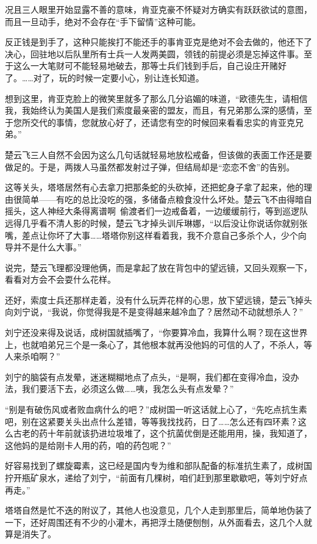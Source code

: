 况且三人眼里开始显露不善的意味，肯亚克豪不怀疑对方确实有跃跃欲试的意图，而且一旦动手，绝对不会存在“手下留情”这种可能。

反正钱是到手了，这种只能挨打不能还手的事肯亚克是绝对不会去做的，他还下了决心，回驻地以后队里所有士兵一人发两美圆，领钱的前提必须是忘掉这件事。至于这么一大笔财可不能轻易地破去，那等士兵们钱到手后，自己设庄开赌好了。……对了，玩的时候一定要小心，别让连长知道。

想到这里，肯亚克脸上的微笑里就多了那么几分谄媚的味道，“欧德先生，请相信我，我始终认为美国人是我们索度最亲密的盟友，而且，有兄弟那么深的感情，至于您所交代的事情，您就放心好了，还请您有空的时候回来看看忠实的肯亚克兄弟。”

楚云飞三人自然不会因为这么几句话就轻易地放松戒备，但该做的表面工作还是要做足的。于是，两拨人马虽然都发射过子弹，但结局却是“恋恋不舍”的告别。

这等关头，塔塔居然有心去拿刀把那条蛇的头砍掉，还把蛇身子拿了起来，他的理由很简单——有吃的总比没吃的强，多储备点粮食没什么坏处。楚云飞不由得暗自摇头，这人神经大条得离谱啊~偷渡者们一边戒备着，一边缓缓前行，等到巡逻队远得几乎看不清人影的时候，楚云飞才掉头训斥琳娜，“以后没让你说话你就别张嘴，差点让你坏了大事……塔塔你别这样看着我，我不介意自己多杀个人，少个向导并不是什么大事。”

说完，楚云飞理都没理他俩，而是拿起了放在背包中的望远镜，又回头观察一下，看看对方会不会耍什么花样。

还好，索度士兵还那样走着，没有什么玩弄花样的心思，放下望远镜，楚云飞掉头向刘宁说，“我说，你觉得我是不是变得越来越冷血了？居然动不动就想杀人？”

刘宁还没来得及说话，成树国就插嘴了，“你要算冷血，我算什么啊？现在这世界上，也就咱弟兄三个是一条心了，其他根本就再没他妈的可信的人了，不杀人，等人来杀咱啊？”

刘宁的脑袋有点发晕，迷迷糊糊地点了点头，“是啊，我们都在变得冷血，没办法，我们要活下去，必须这么做……咦，我怎么头有点发晕？”

“别是有破伤风或者败血病什么的吧？”成树国一听这话就上心了，“先吃点抗生素吧，别在这紧要关头出点什么差错，等等我找找药，日了……怎么还有四环素？这么古老的药十年前就该扔进垃圾堆了，这个抗菌优倒是还能用用，操，我知道了，这他妈的是给刚卡人用的药，咱的药包呢？”

好容易找到了螺旋霉素，这已经是国内专为维和部队配备的标准抗生素了，成树国拧开瓶矿泉水，递给了刘宁，“前面有几棵树，咱们赶到那里歇歇吧，等刘宁好点再走。”

塔塔自然是忙不迭的附议了，其他人也没意见，几个人走到那里后，简单地伪装了一下，还好周围还有不少的小灌木，再把浮土随便刨刨，从外面看去，这几个人就算是消失了。

